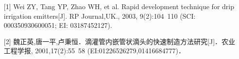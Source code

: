 \begin{itemize}[label={[\arabic*]}, noitemsep]
    \item[{[}1{]}] Wei ZY, Tang YP, Zhao WH, et al. Rapid development technique for drip irrigation emitters[J]. RP Journal,UK., 2003, 9(2):104~110 (SCI: 000350930600051; EI: 03187452127).
    \item[{[}2{]}] 魏正英,唐一平,卢秉恒．滴灌管内嵌管状滴头的快速制造方法研究[J]．农业工程学报, 2001,17(2):55~58 (EI:01226526279,01416684777)．
\end{itemize}

\clearpage  